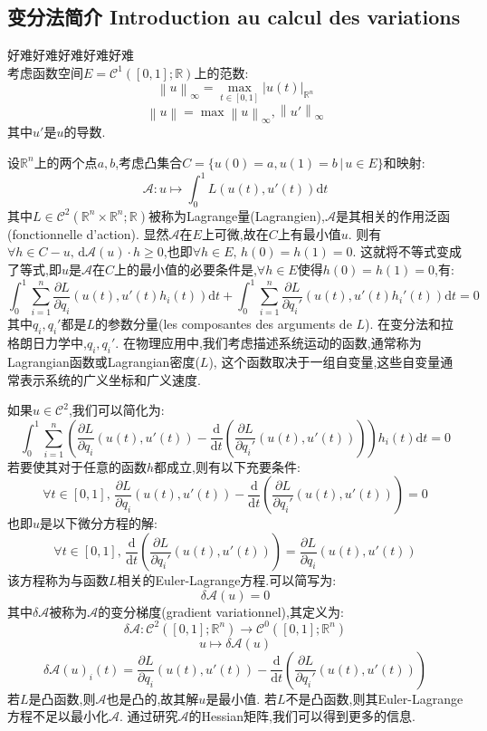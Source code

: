 \documentclass[12pt, a4paper, oneside]{ctexbook}
\newcommand{\di }{\text{d}}%
\newcommand{\pian }{\partial}%
\newcommand{\R }{\mathbb{R}}%
\newcommand{\C }{\mathcal{C}}%
\begin{document}
  \subsection{变分法简介 Introduction au calcul des variations}
  好难好难好难好难好难\\
  考虑函数空间$E=\C^1([0,1];\R)$上的范数:
  $$
  \left\lVert u\right\rVert _\infty=\max_{t\in[0,1]}\left\lvert u(t)\right\rvert _{\R^n}
  $$
  $$
    \left\lVert u\right\rVert =\max{\left\lVert u\right\rVert _\infty,\left\lVert u'\right\rVert _\infty}
  $$
  其中$u'$是$u$的导数.


  设$\R^n$上的两个点$a,b$,考虑凸集合$C=\{u(0)=a,u(1)=b\,|\,u\in E\}$和映射:
  $$
  \mathcal{A}:u\mapsto \int_0^1 L(u(t),u'(t)) \di t
  $$
  其中$L\in\C^2(\R^n\times \R^n;\R)$被称为Lagrange量(Lagrangien),$\mathcal{A}$是其相关的作用泛函(fonctionnelle d'action).
  显然$\mathcal{A}$在$E$上可微,故在$C$上有最小值$u$.
  则有$\forall h\in C-u,\, \di \mathcal{A}(u)\cdot h\geq 0$,也即$\forall h\in E,\,h(0)=h(1)=0$.
  这就将不等式变成了等式,即$u$是$\mathcal{A}$在$C$上的最小值的必要条件是,$\forall h\in E$使得$h(0)=h(1)=0$,有:
  $$
  \int_0^1 \sum_{i=1}^{n} \frac{\pian L}{\pian q_i}(u(t),u'(t)h_i(t))\di t+
  \int_0^1 \sum_{i=1}^{n} \frac{\pian L}{\pian q_i'}(u(t),u'(t)h_i'(t))\di t=0
  $$
  其中$q_i,q_i'$都是$L$的参数分量(les composantes des arguments de $L$).
  在变分法和拉格朗日力学中,$q_i,q_i'$.
  在物理应用中,我们考虑描述系统运动的函数,通常称为Lagrangian函数或Lagrangian密度($L$),
  这个函数取决于一组自变量,这些自变量通常表示系统的广义坐标和广义速度.
  

  如果$u\in\C^2$,我们可以简化为:
  $$
    \int_0^1 \sum_{i=1}^{n} (\frac{\pian L}{\pian q_i}(u(t),u'(t))-\frac{\di }{\di t}
    (\frac{\pian L}{\pian q_i'}(u(t),u'(t))))h_i(t)\di t=0
  $$
  若要使其对于任意的函数$h$都成立,则有以下充要条件:
  $$
    \forall t\in[0,1],\,\frac{\pian L}{\pian q_i}(u(t),u'(t))-\frac{\di }{\di t}
    (\frac{\pian L}{\pian q_i'}(u(t),u'(t)))=0
  $$
  也即$u$是以下微分方程的解:
  $$
  \forall t\in[0,1],\,\frac{\di}{\di t}( \frac{\pian L}{\pian q_i'}(u(t),u'(t)))=\frac{\pian L}{\pian q_i}(u(t),u'(t))
  $$
  该方程称为与函数$L$相关的Euler-Lagrange方程.可以简写为:
  $$
    \delta \mathcal{A}(u)=0
  $$
  其中$\delta \mathcal{A} $被称为$\mathcal{A}$的变分梯度(gradient variationnel),其定义为:
  $$
    \delta \mathcal{A}: \C^2([0,1];\R^n)\rightarrow \C^0([0,1];\R^n)
  $$
  $$
    u\mapsto \delta \mathcal{A}(u)
  $$
  $$
    \delta \mathcal{A}(u)_i(t)=\frac{\pian L}{\pian q_i}(u(t),u'(t))-\frac{\di }{\di t}
    (\frac{\pian L}{\pian q_i'}(u(t),u'(t)))
  $$
  若$L$是凸函数,则$\mathcal{A}$也是凸的,故其解$u$是最小值.
  若$L$不是凸函数,则其Euler-Lagrange方程不足以最小化$\mathcal{A}$.
  通过研究$\mathcal{A}$的Hessian矩阵,我们可以得到更多的信息.
\end{document}
